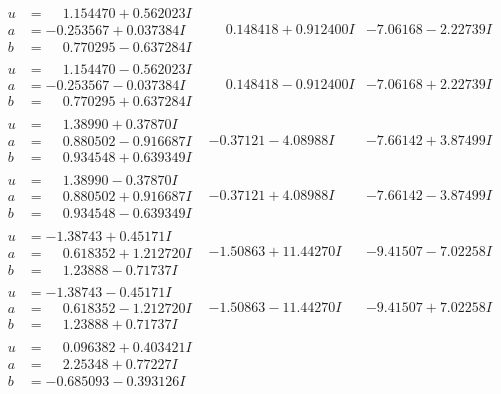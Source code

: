 \documentclass[1p]{elsarticle_modified}
\theoremstyle{definition}
\begin{document}
$$\begin{array}{c|c|c}
\begin{aligned}
u &= \phantom{-}1.154470 + 0.562023 I \\
a &= -0.253567 + 0.037384 I \\
b &= \phantom{-}0.770295 - 0.637284 I\end{aligned}
 & \phantom{-}0.148418 + 0.912400 I & -7.06168 - 2.22739 I \\ \hline\begin{aligned}
u &= \phantom{-}1.154470 - 0.562023 I \\
a &= -0.253567 - 0.037384 I \\
b &= \phantom{-}0.770295 + 0.637284 I\end{aligned}
 & \phantom{-}0.148418 - 0.912400 I & -7.06168 + 2.22739 I \\ \hline\begin{aligned}
u &= \phantom{-}1.38990 + 0.37870 I \\
a &= \phantom{-}0.880502 - 0.916687 I \\
b &= \phantom{-}0.934548 + 0.639349 I\end{aligned}
 & -0.37121 - 4.08988 I & -7.66142 + 3.87499 I \\ \hline\begin{aligned}
u &= \phantom{-}1.38990 - 0.37870 I \\
a &= \phantom{-}0.880502 + 0.916687 I \\
b &= \phantom{-}0.934548 - 0.639349 I\end{aligned}
 & -0.37121 + 4.08988 I & -7.66142 - 3.87499 I \\ \hline\begin{aligned}
u &= -1.38743 + 0.45171 I \\
a &= \phantom{-}0.618352 + 1.212720 I \\
b &= \phantom{-}1.23888 - 0.71737 I\end{aligned}
 & -1.50863 + 11.44270 I & -9.41507 - 7.02258 I \\ \hline\begin{aligned}
u &= -1.38743 - 0.45171 I \\
a &= \phantom{-}0.618352 - 1.212720 I \\
b &= \phantom{-}1.23888 + 0.71737 I\end{aligned}
 & -1.50863 - 11.44270 I & -9.41507 + 7.02258 I \\ \hline\begin{aligned}
u &= \phantom{-}0.096382 + 0.403421 I \\
a &= \phantom{-}2.25348 + 0.77227 I \\
b &= -0.685093 - 0.393126 I\end{aligned}

\end{array}$$
\end{document}
